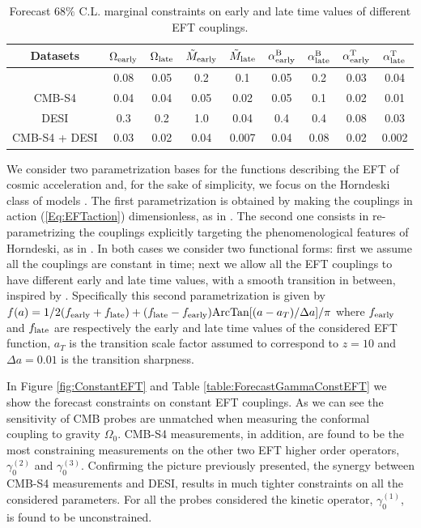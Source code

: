 \begin{table}[t!]
\begin{center}
\begin{tabular}{|c||c|c||c|c|c|c|c|c|} 
\hline
Datasets 			& $\Omega_{\rm early}$ & $\Omega_{\rm late}$ & $\tilde{M}_{\rm early}$ &  $\tilde{M}_{\rm late}$ & $\alpha^{\rm B}_{\rm early}$ & $\alpha^{\rm B}_{\rm late}$ & $\alpha^{\rm T}_{\rm early}$  & $\alpha^{\rm T}_{\rm late}$   \\
\hline
\hline
\planck  		& 0.08 & 0.05 & 0.2 &  0.1 & 0.05 & 0.2 & 0.03 & 0.04 \\
\hline
CMB-S4       &  0.04 &  0.04 & 0.05 & 0.02 & 0.05 & 0.1 & 0.02 & 0.01 \\
\hline
DESI            & 0.3 & 0.2 & 1.0 & 0.04 & 0.4 & 0.4 & 0.08 & 0.03 \\
\hline
CMB-S4 + DESI  &  0.03 &  0.02 & 0.04 & 0.007 & 0.04 & 0.08 & 0.02 & 0.002\\
\hline
\end{tabular}
\caption{Forecast $68\%$ C.L. marginal constraints on early and late time values of different EFT couplings.}
\label{table:ForecastAlphaAtan}
\end{center}
\end{table}

We consider two parametrization bases for the functions describing the EFT of cosmic acceleration and, for the sake of simplicity, we focus on the Horndeski class of models \cite{Horndeski:1974wa}.
%
The first parametrization is obtained by making the couplings in action (\ref{Eq:EFTaction}) dimensionless, as in \cite{Hu:2014oga}.
The second one consists in re-parametrizing the couplings explicitly targeting the phenomenological features of Horndeski, as in \cite{Bellini:2014fua}.
%
In both cases we consider two functional forms: first we assume all the couplings are constant in time; next we allow all the EFT couplings to have different early and late time values, with a smooth transition in between, inspired by \cite{Linder:2015rcz}. Specifically this second parametrization is given by $f(a)= 1/2 (f_{\rm early} + f_{\rm late}) + ( f_{\rm late} -f_{\rm early} ) {\rm ArcTan}[(a - a_T)/\Delta a]/\pi$ where $f_{\rm early}$ and $f_{\rm late}$ are respectively the early and late time values of the considered EFT function, $a_T$ is the transition scale factor assumed to correspond to $z=10$ and $\Delta a=0.01$ is the transition sharpness. 
%

In Figure \ref{fig:ConstantEFT} and Table \ref{table:ForecastGammaConstEFT} we show the forecast constraints on constant EFT couplings. As we can see the sensitivity of CMB probes are unmatched when measuring the conformal coupling to gravity $\Omega_0$. 
CMB-S4 measurements, in addition, are found to be the most constraining measurements on the other two EFT higher order operators, $\gamma_0^{(2)}$ and $\gamma_0^{(3)}$. Confirming the picture previously presented, the synergy between CMB-S4 measurements and DESI, results in much tighter constraints on all the considered parameters.
For all the probes considered the kinetic operator, $\gamma_0^{(1)}$, is found to be unconstrained. 


